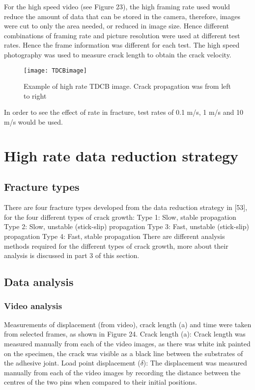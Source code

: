 \documentclass[numbers=noendperiod,chapterprefix=on]{icldt} %
\begin{document}
For the high speed video (see Figure 23), the high framing rate used would reduce the amount of data that can be stored in the camera, therefore, images were cut to only the area needed, or reduced in image size. Hence different combinations of framing rate and picture resolution were used at different test rates. Hence the frame information was different for each test. The high speed photography was used to measure crack length to obtain the crack velocity.

\begin{figure}[!htpb]
\centering
\texttt{[image: TDCBimage]}
\caption{Example of high rate TDCB image. Crack propagation was from left to right} %
\end{figure}

In order to see the effect of rate in fracture, test rates of 0.1 m/s, 1 m/s and 10 m/s would be used.

\section{High rate data reduction strategy}
\subsection{Fracture types}
There are four fracture types developed from the data reduction strategy in [53], for the four different types of crack growth:
\newline
Type 1: Slow, stable propagation
\newline
Type 2: Slow, unstable (stick-slip) propagation
\newline
Type 3: Fast, unstable (stick-slip) propagation
\newline
Type 4: Fast, stable propagation
\newline
There are different analysis methods required for the different types of crack growth, more about their analysis is discussed in part 3 of this section. 

\subsection{Data analysis}
\subsubsection{Video analysis}
Measurements of displacement (from video), crack length (a) and time were taken from selected frames, as shown in Figure 24. 
Crack length (a): Crack length was measured manually from each of the video images, as there was white ink painted on the specimen, the crack was visible as a black line between the substrates of the adhesive joint.
Load point displacement ($\delta$): The displacement was measured manually from each of the video images by recording the distance between the centres of the two pins when compared to their initial positions.
\end{document}
